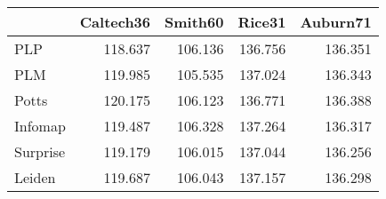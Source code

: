 \begin{tabular}{lrrrr}
\toprule
{} & Caltech36 & Smith60 &  Rice31 & Auburn71 \\
\midrule
PLP      &   118.637 & 106.136 & 136.756 &  136.351 \\
PLM      &   119.985 & 105.535 & 137.024 &  136.343 \\
Potts    &   120.175 & 106.123 & 136.771 &  136.388 \\
Infomap  &   119.487 & 106.328 & 137.264 &  136.317 \\
Surprise &   119.179 & 106.015 & 137.044 &  136.256 \\
Leiden   &   119.687 & 106.043 & 137.157 &  136.298 \\
\bottomrule
\end{tabular}
